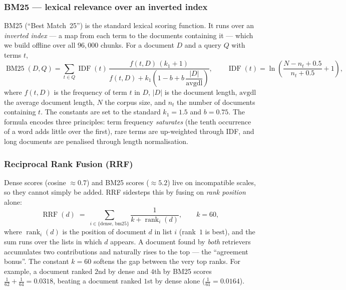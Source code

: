 \subsubsection{BM25 --- lexical relevance over an inverted index}
BM25 (``Best Match~25'') is the standard lexical scoring function. It runs over an
\emph{inverted index} --- a map from each term to the documents containing it --- which we
build offline over all $96{,}000$ chunks. For a document $D$ and a query $Q$ with terms $t$,
\begin{equation}
\operatorname{BM25}(D,Q)
= \sum_{t \in Q} \operatorname{IDF}(t)\,
\frac{f(t,D)\,(k_1+1)}{f(t,D) + k_1\!\left(1 - b + b\,\dfrac{|D|}{\mathrm{avgdl}}\right)},
\qquad
\operatorname{IDF}(t) = \ln\!\left(\frac{N - n_t + 0.5}{n_t + 0.5} + 1\right),
\end{equation}
where $f(t,D)$ is the frequency of term $t$ in $D$, $|D|$ is the document length,
$\mathrm{avgdl}$ the average document length, $N$ the corpus size, and $n_t$ the number of
documents containing $t$. The constants are set to the standard $k_1 = 1.5$ and $b = 0.75$.
The formula encodes three principles: term frequency \emph{saturates} (the tenth occurrence of
a word adds little over the first), rare terms are up-weighted through IDF, and long documents
are penalised through length normalisation.

\subsubsection{Reciprocal Rank Fusion (RRF)}
Dense scores (cosine $\approx 0.7$) and BM25 scores ($\approx 5.2$) live on incompatible
scales, so they cannot simply be added. RRF sidesteps this by fusing on \emph{rank position}
alone:
\begin{equation}
\operatorname{RRF}(d) \;=\; \sum_{i \in \{\text{dense},\,\text{bm25}\}}
\frac{1}{k + \operatorname{rank}_i(d)},
\qquad k = 60,
\end{equation}
where $\operatorname{rank}_i(d)$ is the position of document $d$ in list $i$ (rank~$1$ is best),
and the sum runs over the lists in which $d$ appears. A document found by \emph{both}
retrievers accumulates two contributions and naturally rises to the top --- the ``agreement
bonus''. The constant $k = 60$ softens the gap between the very top ranks. For example, a
document ranked $2$nd by dense and $4$th by BM25 scores
$\tfrac{1}{62} + \tfrac{1}{64} = 0.0318$, beating a document ranked $1$st by dense alone
($\tfrac{1}{61} = 0.0164$).


